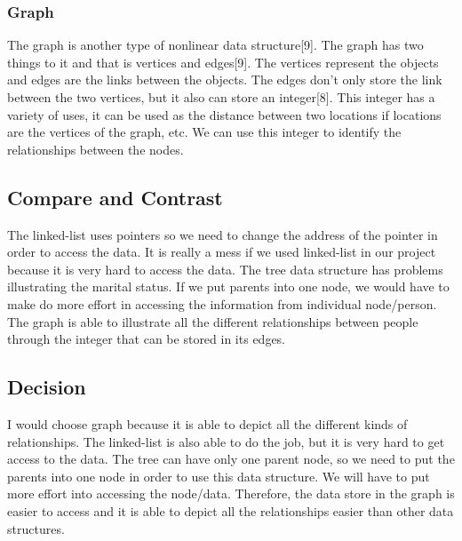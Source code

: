 \documentclass[onecolumn, draftclsnofoot,10pt, compsoc]{IEEEtran}
\begin{document}
\subsubsection{Graph}
\begin{singlespace}
The graph is another type of nonlinear data structure[9]. The graph has two things to it and that is vertices and edges[9]. The vertices represent the objects and edges are the links between the objects. The edges don't only store the link between the two vertices, but it also can store an integer[8]. This integer has a variety of uses, it can be used as the distance between two locations if locations are the vertices of the graph, etc. We can use this integer to identify the relationships between the nodes.
\end{singlespace}

\subsection{Compare and Contrast}
\begin{singlespace}
The linked-list uses pointers so we need to change the address of the pointer in order to access the data. It is really a mess if we used linked-list in our project because it is very hard to access the data. The tree data structure has problems illustrating the marital status. If we put parents into one node, we would have to make do more effort in accessing the information from individual node/person. The graph is able to illustrate all the different relationships between people through the integer that can be stored in its edges. 
\end{singlespace}

\subsection{Decision}
\begin{singlespace}
I would choose graph because it is able to depict all the different kinds of relationships. The linked-list is also able to do the job, but it is very hard to get access to the data. The tree can have only one parent node, so we need to put the parents into one node in order to use this data structure. We will have to put more effort into accessing the node/data. Therefore, the data store in the graph is easier to access and it is able to depict all the relationships easier than other data structures.   
\end{singlespace}

\newpage
\end{document}
